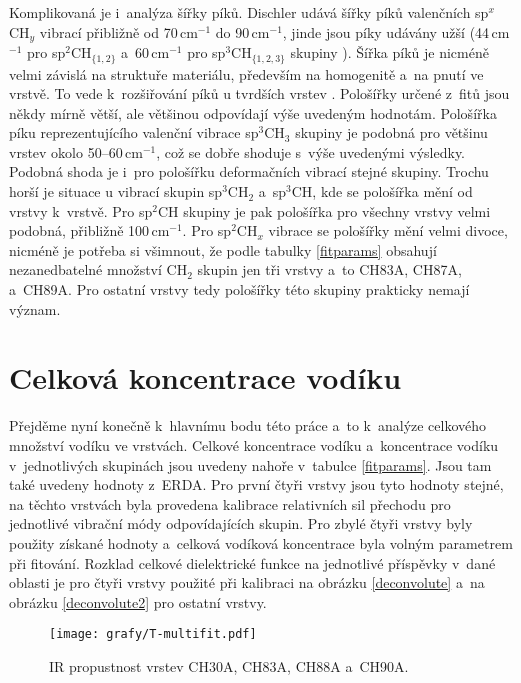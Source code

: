 \label{sirky}
Komplikovaná je i~analýza šířky píků. Dischler \cite{Dischler1983} udává šířky píků valenčních sp$^x$CH$_y$ vibrací přibližně od 70\,cm$^{-1}$ do 90\,cm$^{-1}$, jinde jsou píky udávány užší (44\,cm$^{-1}$ pro sp$^2$CH$_{\{1,2\}}$ a~60\,cm$^{-1}$ pro sp$^3$CH$_{\{1,2,3\}}$ skupiny \cite{Zajickova2011}). Šířka píků je nicméně velmi závislá na struktuře materiálu, především na homogenitě a~na pnutí ve vrstvě. 
To vede k~rozšiřování píků u tvrdších vrstev \cite{Ristein1998}. Pološířky určené z~fitů jsou někdy mírně větší, ale většinou odpovídají výše uvedeným hodnotám. Pološířka píku reprezentujícího valenční vibrace sp$^3$CH$_3$ skupiny je podobná pro většinu vrstev okolo 50--60\,cm$^{-1}$, což se dobře shoduje s~výše uvedenými výsledky.
Podobná shoda je i~pro pološířku deformačních vibrací stejné skupiny. Trochu horší je situace u vibrací skupin sp$^3$CH$_2$ a~sp$^3$CH, kde se pološířka mění od vrstvy k~vrstvě. Pro sp$^2$CH skupiny je pak pološířka pro všechny vrstvy velmi podobná, přibližně 100\,cm$^{-1}$. Pro sp$^2$CH$_x$ vibrace se pološířky mění velmi divoce, nicméně je potřeba si všimnout, že podle tabulky \ref{fitparams} obsahují nezanedbatelné množství CH$_2$ skupin jen tři vrstvy a~to CH83A, CH87A, a~CH89A. Pro ostatní vrstvy tedy pološířky této skupiny prakticky nemají význam.

\section{Celková koncentrace vodíku}
Přejděme nyní konečně k~hlavnímu bodu této práce a~to k~analýze celkového množství vodíku ve vrstvách. Celkové koncentrace vodíku a~koncentrace vodíku v~jednotlivých skupinách jsou uvedeny nahoře v~tabulce \ref{fitparams}. 
Jsou tam také uvedeny hodnoty z~ERDA. Pro první čtyři vrstvy jsou tyto hodnoty stejné, na těchto vrstvách byla provedena kalibrace relativních sil přechodu pro jednotlivé vibrační módy odpovídajících skupin. 
Pro zbylé čtyři vrstvy byly použity získané hodnoty a~celková vodíková koncentrace byla volným parametrem při fitování. Rozklad celkové dielektrické funkce na jednotlivé příspěvky v~dané oblasti je pro čtyři vrstvy použité při kalibraci na obrázku \ref{deconvolute} a~na obrázku \ref{deconvolute2} pro ostatní vrstvy.
 
\begin{figure}[htbp]
	\texttt{[image: grafy/T-multifit.pdf]}
	\caption{IR propustnost vrstev CH30A, CH83A, CH88A a~CH90A.}
	\label{T-multifit}
\end{figure}


